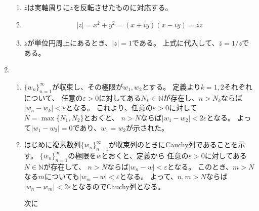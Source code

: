 \documentclass{jreport}
\begin{document}
\begin{enumerate}[label=\textbf{\arabic*.}]
\begin{enumerate}
\item $\bar{z}$は実軸周りに$z$を反転させたものに対応する。
\item 
\begin{align*}
|z|=x^{2}+y^{2}=(x+iy)(x-iy)=z\bar{z}
\end{align*}
\item $z$が単位円周上にあるとき、$|z|=1$である。
上式に代入して、$\bar{z}=1/z$である。
\end{enumerate}
\item
\begin{enumerate}
\item $\{w_{n}\}_{n=1}^{\infty}$が収束し、その極限が$w_{1},w_{2}$とする。
定義より$k=1,2$それぞれについて、
任意の$\varepsilon>0$に対してある$N_{k}\in\mathbb{N}$が存在し、$n>N_{k}$ならば
$|w_{n}-w_{k}|<\varepsilon$となる。
これより、任意の$\varepsilon>0$に対して$N=\max\{N_{1},N_{2}\}$とおくと、
$n>N$ならば$|w_{1}-w_{2}|<2\varepsilon$となる。
よって$|w_{1}-w_{2}|=0$であり、$w_{1}=w_{2}$が示された。
\item はじめに複素数列$\{w_{n}\}_{n=1}^{\infty}$が収束列のときにCauchy列であることを示す。
$\{w_{n}\}_{n=1}^{\infty}$の極限を$w$とおくと、定義から
任意の$\varepsilon>0$に対してある$N\in\mathbb{N}$が存在して、
$n>N$ならば$|w_{n}-w|<\varepsilon$となる。
このとき、$m>N$なる$m$についても$|w_{m}-w|<\varepsilon$となる。
よって、$n,m>N$ならば$|w_{n}-w_{m}|<2\varepsilon$となるのでCauchy列となる。

次に
\end{enumerate}
\end{enumerate}
\end{document}
